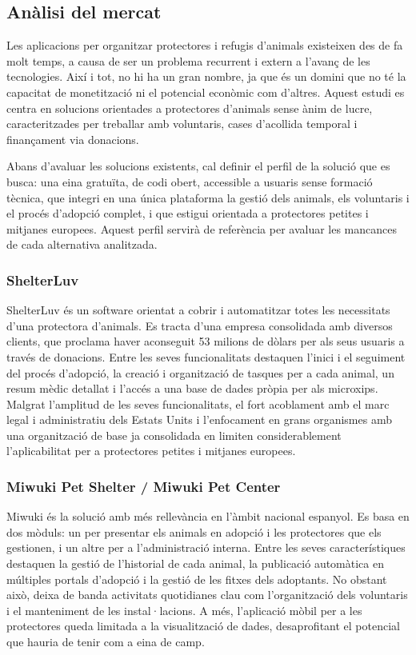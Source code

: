 \documentclass[11pt,a4paper]{report}
\begin{document}
\subsection{Anàlisi del mercat}
Les aplicacions per organitzar protectores i refugis d’animals existeixen des de fa molt temps, a causa de ser un problema recurrent i extern a l’avanç de les tecnologies. Així i tot, no hi ha un gran nombre, ja que és un domini que no té la capacitat de monetització ni el potencial econòmic com d’altres. Aquest estudi es centra en solucions orientades a protectores d'animals sense ànim de lucre, caracteritzades per treballar amb voluntaris, cases d'acollida temporal i finançament via donacions.

Abans d'avaluar les solucions existents, cal definir el perfil de la solució que es busca: 
una eina gratuïta, de codi obert, accessible a usuaris sense formació tècnica, que integri 
en una única plataforma la gestió dels animals, els voluntaris i el procés d'adopció complet, 
i que estigui orientada a protectores petites i mitjanes europees. Aquest perfil servirà de 
referència per avaluar les mancances de cada alternativa analitzada.

\subsubsection[ShelterLuv]{ShelterLuv \cite{shelterluv_shelterluv_nodate}}
ShelterLuv és un software orientat a cobrir i automatitzar totes les necessitats d'una protectora d'animals. Es tracta d'una empresa consolidada amb diversos clients, que proclama haver aconseguit 53 milions de dòlars per als seus usuaris a través de donacions. Entre les seves funcionalitats destaquen l'inici i el seguiment del procés d'adopció, la creació i organització de tasques per a cada animal, un resum mèdic detallat i l'accés a una base de dades pròpia per als microxips. Malgrat l'amplitud de les seves funcionalitats, el fort acoblament amb el marc legal i administratiu dels Estats Units i l'enfocament en grans organismes amb una organització de base ja consolidada en limiten considerablement l'aplicabilitat per a protectores petites i mitjanes europees.

\subsubsection[Miwuki Pet Shelter / Miwuki Pet Center]{Miwuki Pet Shelter / Miwuki Pet Center \cite{miwuki_miwuki_nodate}}
Miwuki és la solució amb més rellevància en l'àmbit nacional espanyol. Es basa en dos mòduls: un per presentar els animals en adopció i les protectores que els gestionen, i un altre per a l'administració interna. Entre les seves característiques destaquen la gestió de l'historial de cada animal, la publicació automàtica en múltiples portals d'adopció i la gestió de les fitxes dels adoptants. No obstant això, deixa de banda activitats quotidianes clau com l'organització dels voluntaris i el manteniment de les instal·lacions. A més, l'aplicació mòbil per a les protectores queda limitada a la visualització de dades, desaprofitant el potencial que hauria de tenir com a eina de camp.
\end{document}
